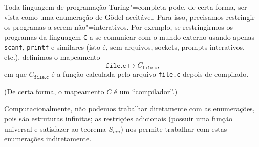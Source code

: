 \begin{example}
    Toda linguagem de programação Turing"=completa pode,
    de certa forma,
    ser vista como uma enumeração de Gödel aceitável.
    Para isso,
    precisamos restringir os programas a serem não"=interativos.
    Por exemplo,
    se restringirmos os programas da linguagem \verb"C"
    a se comunicar com o mundo externo
    usando apenas \verb"scanf", \verb"printf" e similares
    (isto é, sem arquivos, sockets, prompts interativos, etc.),
    definimos o mapeamento
    \begin{equation*}
        \texttt{file.c} \mapsto C_{\texttt{file.c}},
    \end{equation*}
    em que $C_{\texttt{file.c}}$ é a função calculada pelo arquivo \verb"file.c"
    depois de compilado.

    (De certa forma, o mapeamento $C$ é um ``compilador''.)
\end{example}

Computacionalmente,
não podemos trabalhar diretamente com as enumerações,
pois são estruturas infinitas;
as restrições adicionais
(possuir uma função universal e satisfazer ao teorema $S_{mn}$)
nos permite trabalhar com estas enumerações indiretamente.
